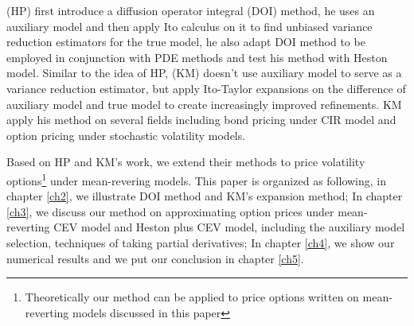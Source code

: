 \cite{heath_variance_2002}(HP) first introduce a diffusion operator integral (DOI) method, he uses an auxiliary model and then apply Ito calculus on it to find unbiased variance reduction estimators for the true model, he also adapt DOI method to be employed in conjunction with PDE methods and test his method with Heston model. Similar to the idea of HP, \cite{kristensen_adding_2011}(KM) doesn't use auxiliary model to serve as a variance reduction estimator, but apply Ito-Taylor expansions on the difference of auxiliary model and true model to  create increasingly improved refinements. KM apply his method on several fields including bond pricing under CIR model and option pricing under stochastic volatility models.

Based on HP and KM's work, we extend their methods to price volatility options\footnote{Theoretically our method can be applied to price options written on mean-reverting models discussed in this paper} under mean-revering models. This paper is organized as following, in chapter \ref{ch2}, we illustrate DOI method and KM's expansion method; In chapter \ref{ch3}, we discuss our method on approximating option prices under mean-reverting CEV model and Heston plus CEV model, including the auxiliary model selection, techniques of taking partial derivatives; In chapter \ref{ch4}, we show our numerical results and we put our conclusion in chapter \ref{ch5}.